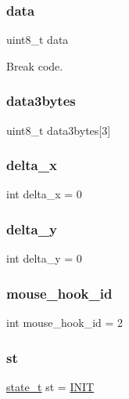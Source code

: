 \subsubsection{\texorpdfstring{data}{data}}
{\footnotesize\ttfamily uint8\+\_\+t data}



Break code. 

\mbox{\label{group__mouse_ga9f33ecfca24a9211fc0fe7d4633087be}} 
\subsubsection{\texorpdfstring{data3bytes}{data3bytes}}
{\footnotesize\ttfamily uint8\+\_\+t data3bytes\mbox{[}3\mbox{]}}

\mbox{\label{group__mouse_ga33c33c30bb98b3e86f856cc0f031d1f2}} 
\subsubsection{\texorpdfstring{delta\+\_\+x}{delta\_x}}
{\footnotesize\ttfamily int delta\+\_\+x = 0}

\mbox{\label{group__mouse_ga293bf93983300c292a4aaa40d7104917}} 
\subsubsection{\texorpdfstring{delta\+\_\+y}{delta\_y}}
{\footnotesize\ttfamily int delta\+\_\+y = 0}

\mbox{\label{group__mouse_ga37cad7cad93664f8a1ed1b0258fe958b}} 
\subsubsection{\texorpdfstring{mouse\+\_\+hook\+\_\+id}{mouse\_hook\_id}}
{\footnotesize\ttfamily int mouse\+\_\+hook\+\_\+id = 2}

\mbox{\label{group__mouse_ga9a379079ab305d43e4c73334578f9325}} 
\subsubsection{\texorpdfstring{st}{st}}
{\footnotesize\ttfamily \hyperlink{mouse_8h_aa0aafed44fec19806d8f9ad834be1248}{state\+\_\+t} st = \hyperlink{mouse_8h_aa0aafed44fec19806d8f9ad834be1248a0cb1b2c6a7db1f1084886c98909a3f36}{I\+N\+IT}}

